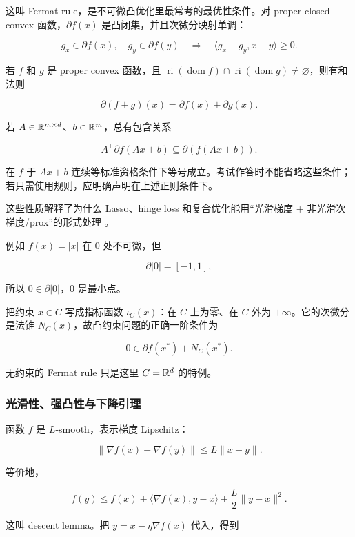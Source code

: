 \documentclass[11pt]{ctexart}
\begin{document}
这叫 Fermat rule，是不可微凸优化里最常考的最优性条件。对 proper closed convex 函数，\(\partial f(x)\) 是凸闭集，并且次微分映射单调：

\[
  g_x\in\partial f(x),\quad g_y\in\partial f(y)
  \quad\Longrightarrow\quad
  \langle g_x-g_y,x-y\rangle\ge0.
\]

若 \(f\) 和 \(g\) 是 proper convex 函数，且
\(\operatorname{ri}(\operatorname{dom}f)\cap\operatorname{ri}(\operatorname{dom}g)\ne\varnothing\)，则有和法则

\[
  \partial(f+g)(x)
  =
  \partial f(x)+\partial g(x).
\]

若 \(A\in\mathbb{R}^{m\times d}\)、\(b\in\mathbb{R}^m\)，总有包含关系

\[
  A^\top\partial f(Ax+b)
  \subseteq
  \partial(f(Ax+b)).
\]

在 \(f\) 于 \(Ax+b\) 连续等标准资格条件下等号成立。考试作答时不能省略这些条件；若只需使用规则，应明确声明在上述正则条件下。

这些性质解释了为什么 Lasso、hinge loss 和复合优化能用“光滑梯度 + 非光滑次梯度/prox”的形式处理 \parencite{nesterov2018convex,beck2017first}。

例如 \(f(x)=|x|\) 在 \(0\) 处不可微，但

\[
  \partial |0|=[-1,1],
\]

所以 \(0\in\partial |0|\)，\(0\) 是最小点。

\begin{example}[约束与法锥]
把约束 \(x\in C\) 写成指标函数 \(\iota_C(x)\)：在 \(C\) 上为零、在 \(C\) 外为 \(+\infty\)。它的次微分是法锥 \(N_C(x)\)，故凸约束问题的正确一阶条件为

\[
  0\in\partial f(x^*)+N_C(x^*).
\]

无约束的 Fermat rule 只是这里 \(C=\mathbb{R}^d\) 的特例。
\end{example}

\subsubsection{光滑性、强凸性与下降引理}


函数 \(f\) 是 \(L\)-smooth，表示梯度 Lipschitz：

\[
  \|\nabla f(x)-\nabla f(y)\|
  \le
  L\|x-y\|.
\]

等价地，

\[
  f(y)
  \le
  f(x)+\langle\nabla f(x),y-x\rangle
  +\frac{L}{2}\|y-x\|^2.
\]

这叫 descent lemma。把 \(y=x-\eta\nabla f(x)\) 代入，得到
\end{document}
